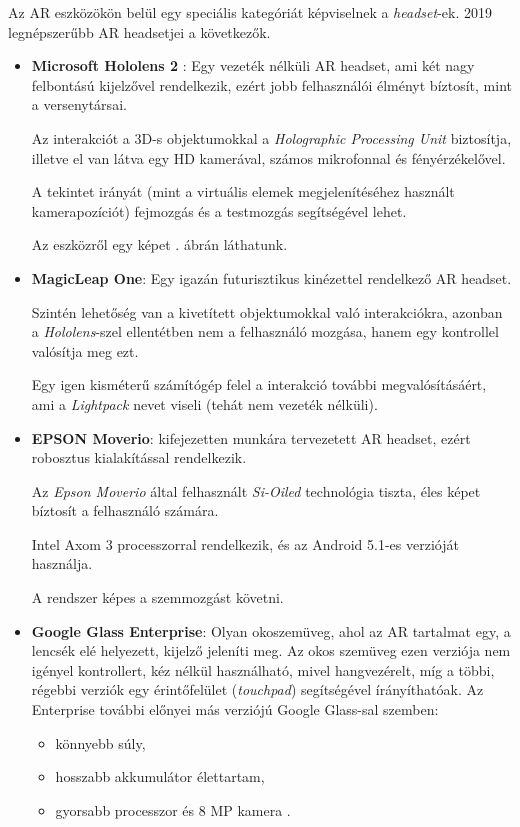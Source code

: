 Az AR eszközökön belül egy speciális kategóriát képviselnek a \textit{headset}-ek.
2019 legnépszerűbb AR headsetjei a következők.
\begin{itemize}
\item {\bf Microsoft Hololens 2} \cite{kalantari2018exploring}: Egy vezeték nélküli AR headset, ami két nagy felbontású kijelzővel rendelkezik, ezért jobb felhasználói élményt bíztosít, mint a versenytársai.

Az interakciót a 3D-s objektumokkal a \textit{Holographic Processing Unit} biztosítja, illetve el van látva egy HD kamerával, számos mikrofonnal és fényérzékelővel.

A tekintet irányát (mint a virtuális elemek megjelenítéséhez használt kamerapozíciót) fejmozgás és a testmozgás segítségével lehet.

Az eszközről egy képet . ábrán láthatunk.

\item {\bf MagicLeap One}: Egy igazán futurisztikus kinézettel rendelkező AR headset.

Szintén lehetőség van a kivetített objektumokkal való interakciókra, azonban a \textit{Hololens}-szel ellentétben nem a felhasználó mozgása, hanem egy kontrollel valósítja meg ezt. 

Egy igen kisméterű számítógép felel a interakció további megvalósításáért, ami a \textit{Lightpack} nevet viseli (tehát nem vezeték nélküli).
  
\item {\bf EPSON Moverio}: kifejezetten munkára tervezetett AR headset, ezért robosztus kialakítással rendelkezik.

Az \textit{Epson Moverio} által felhasznált \textit{Si-Oiled} technológia tiszta, éles képet bíztosít a felhasználó számára.

Intel Axom 3 processzorral rendelkezik, és az Android 5.1-es verzióját használja. 

A rendszer képes a szemmozgást követni.

\item {\bf Google Glass Enterprise}: Olyan okoszemüveg, ahol az AR tartalmat egy, a lencsék elé helyezett, kijelző jeleníti meg. 
Az okos szemüveg ezen verziója nem igényel kontrollert, kéz nélkül használható, mivel hangvezérelt, míg a többi, régebbi verziók egy érintőfelület (\textit{touchpad}) segítségével írányíthatóak.
Az Enterprise további előnyei más verziójú Google Glass-sal szemben:
\begin{itemize}
\item könnyebb súly,
\item hosszabb akkumulátor élettartam,
\item gyorsabb processzor és 8 MP kamera \cite{arhardware}.
\end{itemize}
\end{itemize}

